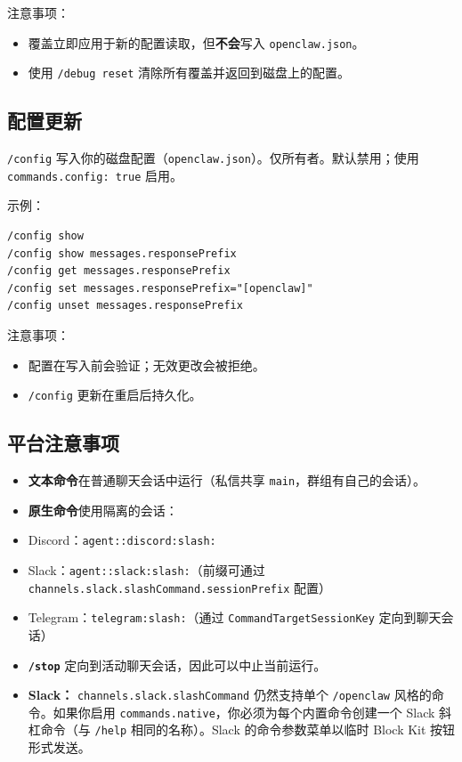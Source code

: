 注意事项：

\begin{itemize}
  \item 覆盖立即应用于新的配置读取，但\textbf{不会}写入 \texttt{openclaw.json}。
  \item 使用 \texttt{/debug reset} 清除所有覆盖并返回到磁盘上的配置。
\end{itemize}


\subsection{配置更新}


\texttt{/config} 写入你的磁盘配置（\texttt{openclaw.json}）。仅所有者。默认禁用；使用 \texttt{commands.config: true} 启用。

示例：

\begin{lstlisting}
/config show
/config show messages.responsePrefix
/config get messages.responsePrefix
/config set messages.responsePrefix="[openclaw]"
/config unset messages.responsePrefix
\end{lstlisting}


注意事项：

\begin{itemize}
  \item 配置在写入前会验证；无效更改会被拒绝。
  \item \texttt{/config} 更新在重启后持久化。
\end{itemize}


\subsection{平台注意事项}


\begin{itemize}
  \item \textbf{文本命令}在普通聊天会话中运行（私信共享 \texttt{main}，群组有自己的会话）。
  \item \textbf{原生命令}使用隔离的会话：
  \item Discord：\texttt{agent::discord:slash:}
  \item Slack：\texttt{agent::slack:slash:}（前缀可通过 \texttt{channels.slack.slashCommand.sessionPrefix} 配置）
  \item Telegram：\texttt{telegram:slash:}（通过 \texttt{CommandTargetSessionKey} 定向到聊天会话）
  \item \textbf{\texttt{/stop}} 定向到活动聊天会话，因此可以中止当前运行。
  \item \textbf{Slack：} \texttt{channels.slack.slashCommand} 仍然支持单个 \texttt{/openclaw} 风格的命令。如果你启用 \texttt{commands.native}，你必须为每个内置命令创建一个 Slack 斜杠命令（与 \texttt{/help} 相同的名称）。Slack 的命令参数菜单以临时 Block Kit 按钮形式发送。
\end{itemize}



